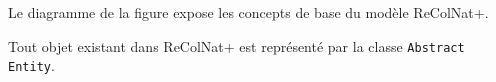 \startsection[title={Éléments de modélisation}]

Le diagramme de la figure  expose les concepts de base du modèle ReColNat+.

Tout objet existant dans ReColNat+ est représenté par la classe {\tt Abstract Entity}.

